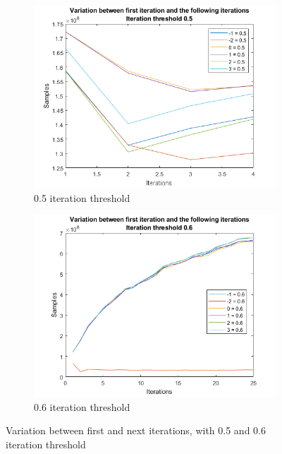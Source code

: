 \begin{figure}
    \centering
    \begin{subfigure}[b]{.45\textwidth}
        \centering
        \includegraphics[width=\textwidth]{figures/varfirst-0.5.png}
        \caption{0.5 iteration threshold}
        \label{sfig:iter:varfirst0.5}
    \end{subfigure}
    \hfill
    \begin{subfigure}[b]{.45\textwidth}
        \centering
        \includegraphics[width=\textwidth]{figures/varfirst-0.6.png}
        \caption{0.6 iteration threshold}
        \label{sfig:iter:varfirst0.6}
    \end{subfigure}
    \caption{Variation between first and next iterations, with 0.5 and 0.6 iteration threshold}
    \label{fig:iter:varfirst0.50.6}
\end{figure}

